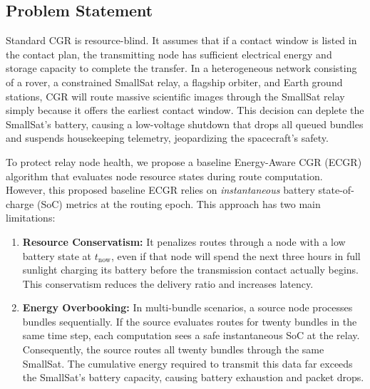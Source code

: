 \documentclass[a4paper,fleqn]{cas-dc}
\newcommand{\ecgr}{\textsf{ECGR}}
\begin{document}
\subsection{Problem Statement}
Standard CGR is resource-blind. It assumes that if a contact window is listed in the contact plan, the transmitting node has sufficient electrical energy and storage capacity to complete the transfer. In a heterogeneous network consisting of a rover, a constrained SmallSat relay, a flagship orbiter, and Earth ground stations, CGR will route massive scientific images through the SmallSat relay simply because it offers the earliest contact window. This decision can deplete the SmallSat's battery, causing a low-voltage shutdown that drops all queued bundles and suspends housekeeping telemetry, jeopardizing the spacecraft's safety.

To protect relay node health, we propose a baseline Energy-Aware CGR (\ecgr{}) algorithm that evaluates node resource states during route computation. However, this proposed baseline \ecgr{} relies on \emph{instantaneous} battery state-of-charge (SoC) metrics at the routing epoch. This approach has two main limitations:
\begin{enumerate}
    \item \textbf{Resource Conservatism:} It penalizes routes through a node with a low battery state at $t_{\text{now}}$, even if that node will spend the next three hours in full sunlight charging its battery before the transmission contact actually begins. This conservatism reduces the delivery ratio and increases latency.
    \item \textbf{Energy Overbooking:} In multi-bundle scenarios, a source node processes bundles sequentially. If the source evaluates routes for twenty bundles in the same time step, each computation sees a safe instantaneous SoC at the relay. Consequently, the source routes all twenty bundles through the same SmallSat. The cumulative energy required to transmit this data far exceeds the SmallSat's battery capacity, causing battery exhaustion and packet drops.
\end{enumerate}
\end{document}
